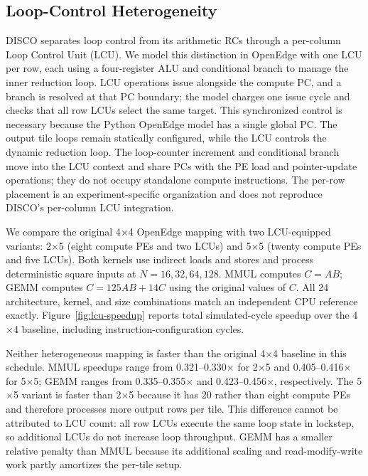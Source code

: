 \subsection{Loop-Control Heterogeneity}
\label{subsec:lcu-ablation}

DISCO separates loop control from its arithmetic RCs through a per-column
Loop Control Unit (LCU). We model this distinction in OpenEdge with one LCU
per row, each using a four-register ALU and conditional branch to manage the
inner reduction loop. LCU operations issue alongside the compute PC, and a
branch is resolved at that PC boundary; the model charges one issue cycle and
checks that all row LCUs select the same target. This synchronized control is
necessary because the Python OpenEdge model has a single global PC. The output
tile loops remain statically configured, while the LCU controls the dynamic
reduction loop. The loop-counter increment and conditional branch move into
the LCU context and share PCs with the PE load and pointer-update operations;
they do not occupy standalone compute instructions. The per-row placement is
an experiment-specific organization and does not reproduce DISCO's
per-column LCU integration.

We compare the original 4$\times$4 OpenEdge mapping with two LCU-equipped
variants: 2$\times$5 (eight compute PEs and two LCUs) and 5$\times$5 (twenty
compute PEs and five LCUs). Both kernels use indirect loads and stores and
process deterministic square inputs at $N=16,32,64,128$. MMUL computes
$C=AB$; GEMM computes $C=125AB+14C$ using the original values of $C$. All 24
architecture, kernel, and size combinations match an independent CPU
reference exactly. Figure~\ref{fig:lcu-speedup} reports total simulated-cycle
speedup over the 4$\times$4 baseline, including instruction-configuration
cycles.

Neither heterogeneous mapping is faster than the original 4$\times$4
baseline in this schedule. MMUL speedups range from 0.321--0.330$\times$ for
2$\times$5 and 0.405--0.416$\times$ for 5$\times$5; GEMM ranges from
0.335--0.355$\times$ and 0.423--0.456$\times$, respectively. The 5$\times$5
variant is faster than 2$\times$5 because it has 20 rather than eight compute
PEs and therefore processes more output rows per tile. This difference cannot
be attributed to LCU count: all row LCUs execute the same loop state in
lockstep, so additional LCUs do not increase loop throughput. GEMM has a
smaller relative penalty than MMUL because its additional scaling and
read-modify-write work partly amortizes the per-tile setup.

